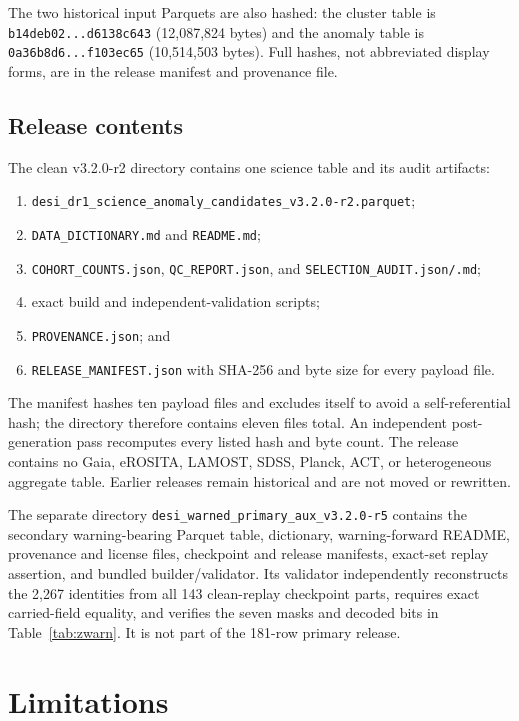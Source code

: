 \documentclass[twocolumn]{aastex701}
\newcommand{\releaseVersion}{v3.2.0-r2}
\begin{document}
The two historical input Parquets are also hashed: the cluster table is
\texttt{b14deb02...d6138c643} (12,087,824 bytes) and the anomaly table is
\texttt{0a36b8d6...f103ec65} (10,514,503 bytes).  Full hashes, not abbreviated display forms, are in
the release manifest and provenance file.

\subsection{Release contents}\label{sec:release}

The clean \releaseVersion{} directory contains one science table and its audit artifacts:
\begin{enumerate}
\item \nolinkurl{desi_dr1_science_anomaly_candidates_v3.2.0-r2.parquet};
\item \texttt{DATA\_DICTIONARY.md} and \texttt{README.md};
\item \texttt{COHORT\_COUNTS.json}, \texttt{QC\_REPORT.json}, and
\texttt{SELECTION\_AUDIT.json/.md};
\item exact build and independent-validation scripts;
\item \texttt{PROVENANCE.json}; and
\item \texttt{RELEASE\_MANIFEST.json} with SHA-256 and byte size for every payload file.
\end{enumerate}
The manifest hashes ten payload files and excludes itself to avoid a self-referential hash;
the directory therefore contains eleven files total.  An independent post-generation
pass recomputes every listed hash and byte count.  The release contains no Gaia, eROSITA, LAMOST,
SDSS, Planck, ACT, or heterogeneous aggregate table.  Earlier releases remain historical and are
not moved or rewritten.

The separate directory \nolinkurl{desi_warned_primary_aux_v3.2.0-r5} contains the secondary
warning-bearing Parquet table, dictionary, warning-forward README, provenance and license files,
checkpoint and release manifests, exact-set replay assertion, and bundled builder/validator.
Its validator independently reconstructs the 2,267 identities from all 143 clean-replay
checkpoint parts, requires exact carried-field equality, and verifies the seven masks and decoded
bits in Table~\ref{tab:zwarn}.  It is not part of the 181-row primary release.

\section{Limitations}\label{sec:limitations}
\end{document}
